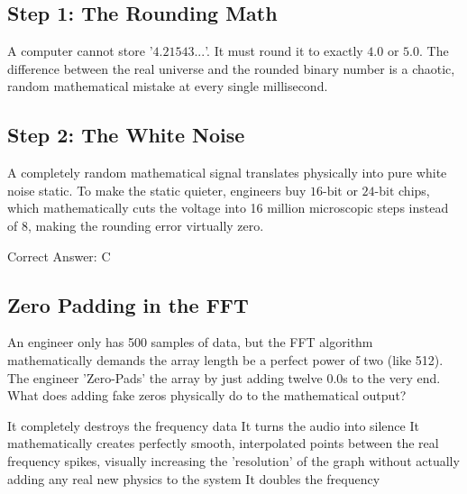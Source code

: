 \begin{solution}

\subsection*{Step 1: The Rounding Math}
A computer cannot store '$4.21543...$'. It must round it to exactly $4.0$ or $5.0$. The difference between the real universe and the rounded binary number is a chaotic, random mathematical mistake at every single millisecond.

\subsection*{Step 2: The White Noise}
A completely random mathematical signal translates physically into pure white noise static. To make the static quieter, engineers buy $16\text{-bit}$ or $24\text{-bit}$ chips, which mathematically cuts the voltage into 16 million microscopic steps instead of 8, making the rounding error virtually zero.

Correct Answer: C
\end{solution}

\clearpage

\subsection{Zero Padding in the FFT}

An engineer only has 500 samples of data, but the FFT algorithm mathematically demands the array length be a perfect power of two (like 512). The engineer 'Zero-Pads' the array by just adding twelve $0.0$s to the very end. What does adding fake zeros physically do to the mathematical output?

\begin{choices}
    \choice It completely destroys the frequency data
    \choice It turns the audio into silence
    \correctchoice It mathematically creates perfectly smooth, interpolated points between the real frequency spikes, visually increasing the 'resolution' of the graph without actually adding any real new physics to the system
    \choice It doubles the frequency
\end{choices}

